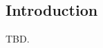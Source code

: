 \chapter[\cintzeroshorttitle{}]{\cintzeroshorttitle{}}

\label{cint0}

\section{Introduction}
\label{cint0:sint0}

TBD.


